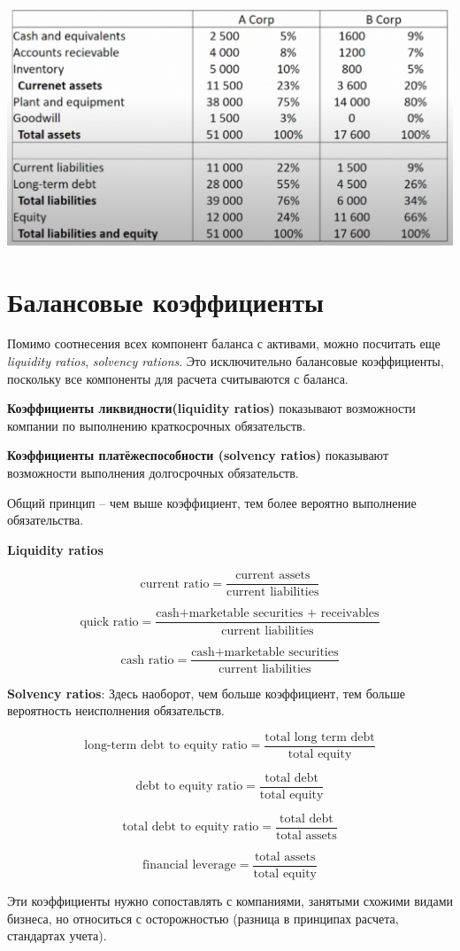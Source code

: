 \documentclass{article}
\begin{document}
\includegraphics[width=150mm]{common-size.png}


\section{Балансовые коэффициенты}
Помимо соотнесения всех компонент баланса с активами, можно посчитать еще \textit{liquidity ratios}, \textit{solvency rations}. Это исключительно балансовые коэффициенты, поскольку все компоненты для расчета считываются с баланса.

\textbf{Коэффициенты ликвидности(liquidity ratios)} показывают возможности компании по выполнению краткосрочных обязательств.

\textbf{Коэффициенты платёжеспособности (solvency ratios)} показывают возможности выполнения долгосрочных обязательств.

Общий принцип – чем выше коэффициент, тем более вероятно выполнение обязательства.

\textbf{{Liquidity ratios}}

$$\text{current ratio} = \frac{\text{current assets}}{\text{current liabilities}}$$

$$\text{quick ratio} = \frac{\text{cash+marketable securities + receivables}}{\text{current liabilities}}$$

$$\text{cash ratio} = \frac{\text{cash+marketable securities}}{\text{current liabilities}}$$

\textbf{Solvency ratios}:
Здесь наоборот, чем больше коэффициент, тем больше вероятность неисполнения обязательств.

$$\text{long-term debt to equity ratio} = \frac{\text{total long term debt}}{\text{total equity}}$$

$$\text{debt to equity ratio} = \frac{\text{total debt}}{\text{total equity}}$$

$$\text{total debt to equity ratio} = \frac{\text{total debt}}{\text{total assets}}$$

$$\text{financial leverage} = \frac{\text{total assets}}{\text{total equity}}$$


Эти коэффициенты нужно сопоставлять с компаниями, занятыми схожими видами бизнеса, но относиться с осторожностью (разница в принципах расчета, стандартах учета).



 
\end{document}
